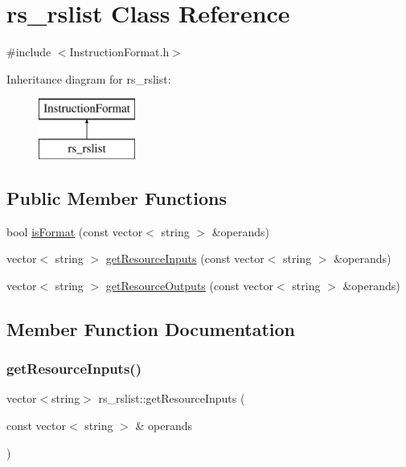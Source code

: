 \hypertarget{classrs__rslist}{}\section{rs\+\_\+rslist Class Reference}
\label{classrs__rslist}


{\ttfamily \#include $<$Instruction\+Format.\+h$>$}

Inheritance diagram for rs\+\_\+rslist\+:\begin{figure}[H]
\begin{center}
\leavevmode
\includegraphics[height=2.000000cm]{classrs__rslist}
\end{center}
\end{figure}
\subsection*{Public Member Functions}
\begin{DoxyCompactItemize}
\item 
bool \hyperlink{classrs__rslist_a761f3da0f588fcd4e93e446c98d4c263}{is\+Format} (const vector$<$ string $>$ \&operands)
\item 
vector$<$ string $>$ \hyperlink{classrs__rslist_a6e678afc02083eaa9c815a291ca010c9}{get\+Resource\+Inputs} (const vector$<$ string $>$ \&operands)
\item 
vector$<$ string $>$ \hyperlink{classrs__rslist_aec1bc27b2d4f484cc2f2c65dd29f8db2}{get\+Resource\+Outputs} (const vector$<$ string $>$ \&operands)
\end{DoxyCompactItemize}


\subsection{Member Function Documentation}
\mbox{\label{classrs__rslist_a6e678afc02083eaa9c815a291ca010c9}} 
\subsubsection{\texorpdfstring{get\+Resource\+Inputs()}{getResourceInputs()}}
{\footnotesize\ttfamily vector$<$string$>$ rs\+\_\+rslist\+::get\+Resource\+Inputs (\begin{DoxyParamCaption}\item[{const vector$<$ string $>$ \&}]{operands }\end{DoxyParamCaption})\hspace{0.3cm}{\ttfamily [virtual]}}

